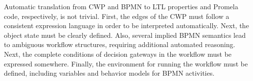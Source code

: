 Automatic translation from CWP and BPMN to LTL properties and Promela code, respectively, is not trivial. First, the edges of the CWP must follow a consistent expression language in order to be interpreted automatically. Next, the object state must be clearly defined. Also, several implied BPMN semantics lead to ambiguous workflow structures, requiring additional automated reasoning. Next, the complete conditions of decision gateways in the workflow must be expressed somewhere. Finally, the environment for running the workflow must be defined, including variables and behavior models for BPMN activities.